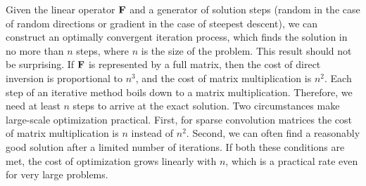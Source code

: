 Given the linear operator $\bold F$ and a generator of solution steps
(random in the case of random directions or gradient in the case of
steepest descent),
we can construct an optimally convergent iteration process,
which finds the solution in no more than $n$ steps,
where $n$ is the size of the problem.
This result should not be surprising.
If $\bold F$ is represented by a full matrix,
then the cost of direct inversion is proportional to $n^3$,
and the cost of matrix multiplication is $n^2$.
Each step of an iterative method boils down to a matrix multiplication.
Therefore, we need at least $n$ steps to arrive at the exact solution.
Two circumstances make large-scale optimization practical.
First, for sparse convolution matrices
the cost of matrix multiplication is $n$ instead of $n^2$.
Second, we can often find a reasonably good solution
after a limited number of iterations.
If both these conditions are met, the cost of optimization
grows linearly with $n$,
which is a practical rate even for very large problems.



